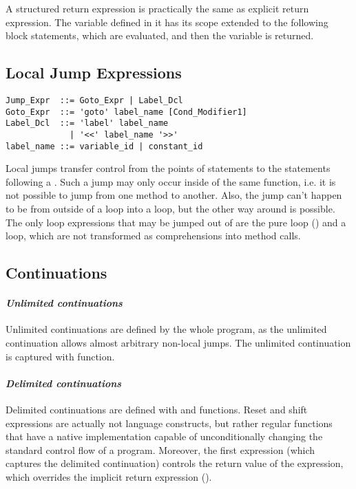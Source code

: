 A structured return expression is practically the same as explicit return expression. The variable defined in it has its scope extended to the following block statements, which are evaluated, and then the variable is returned. 






\subsection{Local Jump Expressions}
\label{sec:local-jump-expressions}

\syntax\begin{lstlisting}
Jump_Expr  ::= Goto_Expr | Label_Dcl
Goto_Expr  ::= 'goto' label_name [Cond_Modifier1]
Label_Dcl  ::= 'label' label_name 
             | '<<' label_name '>>'
label_name ::= variable_id | constant_id
\end{lstlisting}

Local jumps transfer control from the points of  statements to the statements following a . Such a jump may only occur inside of the same function, i.e. it is not possible to jump from one method to another. Also, the jump can't happen to be from outside of a loop into a loop, but the other way around is possible. The only loop expressions that may be jumped out of are the pure loop () and a  loop, which are not transformed as comprehensions into method calls. 






\subsection{Continuations}

\paragraph{\em Unlimited continuations}
Unlimited continuations are defined by the whole program, as the unlimited continuation allows almost arbitrary non-local jumps. The unlimited continuation is captured with  function. 

\paragraph{\em Delimited continuations}
Delimited continuations are defined with  and  functions. Reset and shift expressions are actually not language constructs, but rather regular functions that have a native implementation capable of unconditionally changing the standard control flow of a program. Moreover, the first  expression (which captures the delimited continuation) controls the return value of the  expression, which overrides the implicit return expression ().








